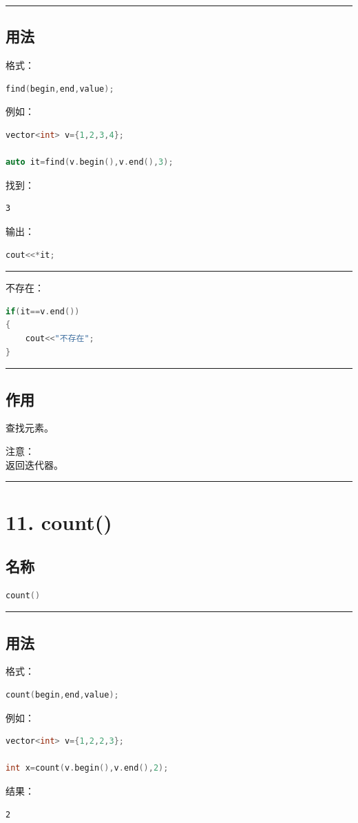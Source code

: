 \documentclass[10pt,twocolumn]{extarticle}
\begin{document}
\noindent\rule{\linewidth}{0.4pt}

\subsection{用法}
格式：
\begin{lstlisting}[language=C++]
find(begin,end,value);
\end{lstlisting}
例如：
\begin{lstlisting}[language=C++]
vector<int> v={1,2,3,4};

auto it=find(v.begin(),v.end(),3);
\end{lstlisting}
找到：
\begin{lstlisting}
3
\end{lstlisting}
输出：
\begin{lstlisting}[language=C++]
cout<<*it;
\end{lstlisting}

\noindent\rule{\linewidth}{0.4pt}

不存在：
\begin{lstlisting}[language=C++]
if(it==v.end())
{
    cout<<"不存在";
}
\end{lstlisting}

\noindent\rule{\linewidth}{0.4pt}

\subsection{作用}
查找元素。

注意：\\
返回迭代器。

\noindent\rule{\linewidth}{0.4pt}

\section{11. count()}

\subsection{名称}
\begin{lstlisting}[language=C++]
count()
\end{lstlisting}

\noindent\rule{\linewidth}{0.4pt}

\subsection{用法}
格式：
\begin{lstlisting}[language=C++]
count(begin,end,value);
\end{lstlisting}
例如：
\begin{lstlisting}[language=C++]
vector<int> v={1,2,2,3};

int x=count(v.begin(),v.end(),2);
\end{lstlisting}
结果：
\begin{lstlisting}
2
\end{lstlisting}
\end{document}
